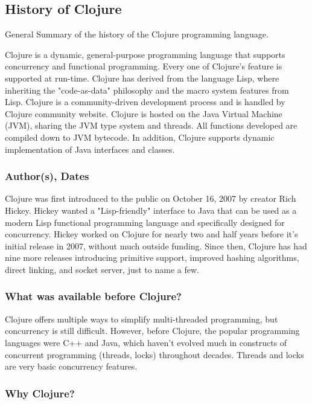 \clojureColor
\subsection{History of Clojure}
    General Summary of the history of the Clojure programming language.

	Clojure is a dynamic, general-purpose programming language that supports concurrency and functional programming. Every one of Clojure's feature is supported at run-time. Clojure has derived from the language Lisp, where inheriting the "code-as-data" philosophy and the macro system features from Lisp. Clojure is a community-driven development process and is handled by Clojure community website. Clojure is hosted on the Java Virtual Machine (JVM), sharing the JVM type system and threads. All functions developed are compiled down to JVM bytecode. In addition, Clojure supports dynamic implementation of Java interfaces and classes.

\subsubsection{Author(s), Dates}

    Clojure was first introduced to the public on October 16, 2007 by creator Rich Hickey. Hickey wanted a "Lisp-friendly" interface to Java that can be used as a modern Lisp functional programming language and specifically designed for concurrency. Hickey worked on Clojure for nearly two and half years before it's initial release in 2007, without much outside funding. Since then, Clojure has had nine more releases introducing primitive support, improved hashing algorithms, direct linking, and socket server, just to name a few.

\subsubsection{What was available before Clojure?}

    Clojure offers multiple ways to simplify multi-threaded programming, but concurrency is still difficult. However, before Clojure, the popular programming languages were C++ and Java, which haven't evolved much in constructs of concurrent programming (threads, locks) throughout decades. Threads and locks are very basic concurrency features. \cite{galpin_2010}

\subsubsection{Why Clojure?}

